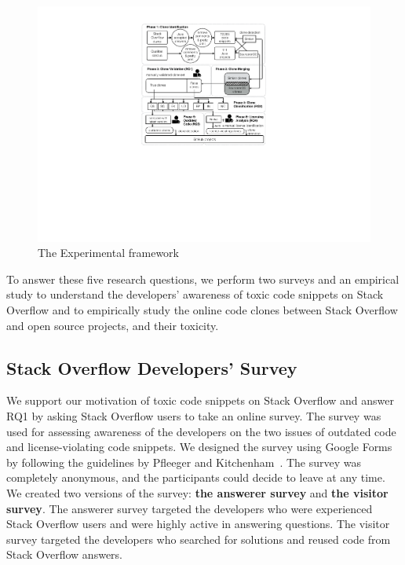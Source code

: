 \documentclass[10pt,journal,compsoc]{IEEEtran}
\begin{document}
\begin{figure}
	\centering
	\includegraphics[width=\linewidth]{exp_framework_new}
	\caption{The Experimental framework}
	\label{fig:exp_framework}
\end{figure}

To answer these five research questions, we perform two surveys and an empirical study to
understand the developers' awareness of toxic code snippets on Stack Overflow and to
empirically study the online code clones between Stack Overflow and open source
projects, and their toxicity. 

\subsection{Stack Overflow Developers' Survey} We support our motivation of
toxic code snippets on Stack Overflow and answer RQ1 by asking Stack
Overflow users to take an online survey. The survey was used for assessing awareness of
the developers on the two issues of outdated code and license-violating code
snippets. We designed the survey using Google Forms by following the guidelines by Pfleeger and
Kitchenham~\cite{Pfleeger2001,Kitchenham2002}. The survey was completely
anonymous, and the participants could decide to leave at any time. 
We created two versions of the survey: \textbf{the answerer survey} and \textbf{the visitor survey}.
The answerer survey targeted the developers who were experienced Stack Overflow users
and were highly active in answering questions. The visitor survey
targeted the developers who searched for solutions and reused code from Stack Overflow answers.
\end{document}
